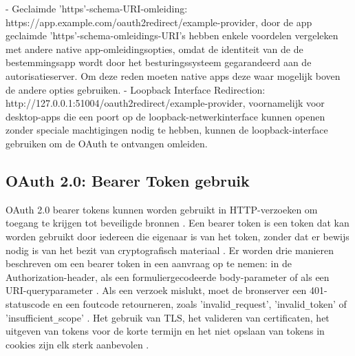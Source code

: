   \newline
  - Geclaimde 'https'-schema-URI-omleiding: https://app.example.com/oauth2redirect/example-provider, door de app geclaimde 'https'-schema-omleidings-URI's hebben enkele voordelen vergeleken met andere native app-omleidingsopties, omdat de identiteit van de de bestemmingsapp wordt door het besturingssysteem gegarandeerd aan de autorisatieserver. Om deze reden moeten native apps deze waar mogelijk boven de andere opties gebruiken.
  \newline
  - Loopback Interface Redirection: http://127.0.0.1:51004/oauth2redirect/example-provider, voornamelijk voor desktop-apps die een poort op de loopback-netwerkinterface kunnen openen zonder speciale machtigingen nodig te hebben, kunnen de loopback-interface gebruiken om de OAuth te ontvangen omleiden.

  
  \subsection{OAuth 2.0: Bearer Token gebruik}%
  \label{subsec:oauth-2.0-bearer-token-gebruik}
  OAuth 2.0 bearer tokens kunnen worden gebruikt in HTTP-verzoeken om toegang te krijgen tot beveiligde bronnen \autocite[p.~{Section 1.0}]{Jones2012}.
  Een bearer token is een token dat kan worden gebruikt door iedereen die eigenaar is van het token, zonder dat er bewijs nodig is van het bezit van cryptografisch materiaal \autocite[p.~{Section 1.2}]{Jones2012}.
  Er worden drie manieren beschreven om een bearer token in een aanvraag op te nemen: in de Authorization-header, als een formuliergecodeerde body-parameter of als een URI-queryparameter \autocite[p.~{Section 2.1}]{Jones2012}. Als een verzoek mislukt, moet de bronserver een 401-statuscode en een foutcode retourneren, zoals 'invalid\verb|_|request', 'invalid\verb|_|token' of 'insufficient\verb|_|scope' \autocite[p.~{Section 3.0}]{Jones2012}.
  Het gebruik van TLS, het valideren van certificaten, het uitgeven van tokens voor de korte termijn en het niet opslaan van tokens in cookies zijn elk sterk aanbevolen \autocite[p.~{Section 5.0}]{Jones2012}.


